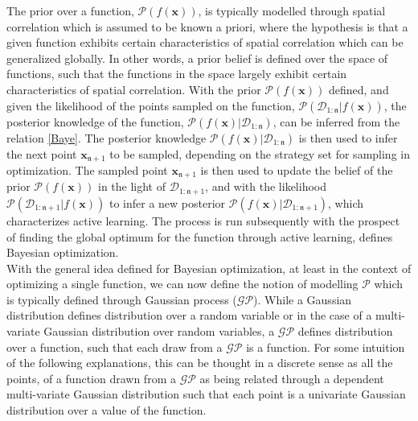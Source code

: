 The prior over a function, $\mathcal{P}(f(\bm{x}))$, is typically modelled through spatial correlation which is assumed to be known a priori, where the hypothesis is that a given function exhibits certain characteristics of spatial correlation which can be generalized globally. 
In other words, a prior belief is defined over the space of functions, such that the functions in the space largely exhibit certain characteristics of spatial correlation. %
 With the prior $\mathcal{P}(f(\bm{x}))$ defined, and given the likelihood of the points sampled on the function, $\mathcal{P}(\mathcal{D}_{1:{\mathfrak{n}}}|f(\bm{x}))$, the posterior knowledge of the function, $\mathcal{P}(f(\bm{x})|\mathcal{D}_{1:{\mathfrak{n}}})$, can be inferred from the relation \eqref{Baye}. 
 The posterior knowledge $\mathcal{P}(f(\bm{x})|\mathcal{D}_{1:{\mathfrak{n}}})$ is then used to infer the next point $\bm{x}_{\mathfrak{n}+1}$ to be sampled, depending on the strategy set for sampling in optimization. 
 The sampled point $\bm{x}_{\mathfrak{n}+1}$ is then used to update the belief of the prior $\mathcal{P}(f(\bm{x}))$ in the light of $\mathcal{D}_{1:{\mathfrak{n}+1}}$, and with the likelihood $\mathcal{P}(\mathcal{D}_{1:{\mathfrak{n}+1}}|f(\bm{x}))$ to infer a new posterior $\mathcal{P}(f(\bm{x})|\mathcal{D}_{1:{\mathfrak{n}+1}})$, which characterizes active learning. 
 The process is run subsequently with the prospect of finding the global optimum for the function through active learning, defines Bayesian optimization.\\

With the general idea defined for Bayesian optimization, at least in the context of optimizing a single function, we can now define the notion of modelling $\mathcal{P}$ which is typically defined through Gaussian process ($\mathcal{GP}$). 
While a Gaussian distribution defines distribution over a random variable or in the case of a multi-variate Gaussian distribution over random variables, a $\mathcal{GP}$ defines distribution over a function, such that each draw from a $\mathcal{GP}$ is a function. 
For some intuition of the following explanations, this can be thought in a discrete sense as all the points, of a function drawn from a $\mathcal{GP}$ as being related through a dependent multi-variate Gaussian distribution such that each point is a univariate Gaussian distribution over a value of the function.\\

